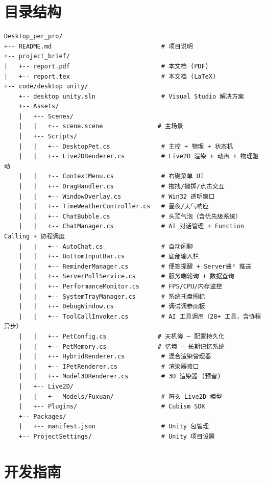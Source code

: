 \documentclass[12pt,a4paper]{ctexart}
\begin{document}
\section{目录结构}

\begin{lstlisting}[frame=single,numbers=none,style=csharp]
Desktop_per_pro/
+-- README.md                              # 项目说明
+-- project_brief/
|   +-- report.pdf                         # 本文档 (PDF)
|   +-- report.tex                         # 本文档 (LaTeX)
+-- code/desktop unity/
    +-- desktop unity.sln                  # Visual Studio 解决方案
    +-- Assets/
    |   +-- Scenes/
    |   |   +-- scene.scene               # 主场景
    |   +-- Scripts/
    |   |   +-- DesktopPet.cs              # 主控 + 物理 + 状态机
    |   |   +-- Live2DRenderer.cs          # Live2D 渲染 + 动画 + 物理驱动
    |   |   +-- ContextMenu.cs             # 右键菜单 UI
    |   |   +-- DragHandler.cs             # 拖拽/抛掷/点击交互
    |   |   +-- WindowOverlay.cs           # Win32 透明窗口
    |   |   +-- TimeWeatherController.cs   # 昼夜/天气响应
    |   |   +-- ChatBubble.cs              # 头顶气泡（含优先级系统）
    |   |   +-- ChatManager.cs             # AI 对话管理 + Function Calling + 协程调度
    |   |   +-- AutoChat.cs                # 自动闲聊
    |   |   +-- BottomInputBar.cs          # 底部输入栏
    |   |   +-- ReminderManager.cs         # 便签提醒 + Server酱³ 推送
    |   |   +-- ServerPollService.cs       # 服务端轮询 + 数据查询
    |   |   +-- PerformanceMonitor.cs      # FPS/CPU/内存监控
    |   |   +-- SystemTrayManager.cs       # 系统托盘图标
    |   |   +-- DebugWindow.cs             # 调试调参面板
    |   |   +-- ToolCallInvoker.cs         # AI 工具调用（28+ 工具，含协程异步）
    |   |   +-- PetConfig.cs              # 天机簿 — 配置持久化
    |   |   +-- PetMemory.cs              # 忆境 — 长期记忆系统
    |   |   +-- HybridRenderer.cs          # 混合渲染管理器
    |   |   +-- IPetRenderer.cs            # 渲染器接口
    |   |   +-- Model3DRenderer.cs         # 3D 渲染器 (预留)
    |   +-- Live2D/
    |   |   +-- Models/Fuxuan/             # 符玄 Live2D 模型
    |   +-- Plugins/                       # Cubism SDK
    +-- Packages/
    |   +-- manifest.json                  # Unity 包管理
    +-- ProjectSettings/                   # Unity 项目设置
\end{lstlisting}

\section{开发指南}
\end{document}

